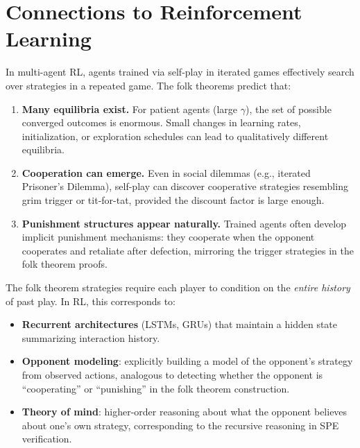 \documentclass[11pt,a4paper]{article}
\begin{document}

\section{Connections to Reinforcement Learning}
\label{sec:rl-connections}

\begin{rlconnection}[title={Self-Play and Emergent Cooperation}]
In multi-agent RL, agents trained via self-play in iterated games
effectively search over strategies in a repeated game. The folk theorems
predict that:
\begin{enumerate}[label=(\roman*)]
    \item \textbf{Many equilibria exist.} For patient agents (large
    $\gamma$), the set of possible converged outcomes is enormous. Small
    changes in learning rates, initialization, or exploration schedules can
    lead to qualitatively different equilibria.
    \item \textbf{Cooperation can emerge.} Even in social dilemmas (e.g.,
    iterated Prisoner's Dilemma), self-play can discover cooperative
    strategies resembling grim trigger or tit-for-tat, provided the
    discount factor is large enough.
    \item \textbf{Punishment structures appear naturally.} Trained agents
    often develop implicit punishment mechanisms: they cooperate when the
    opponent cooperates and retaliate after defection, mirroring the
    trigger strategies in the folk theorem proofs.
\end{enumerate}
\end{rlconnection}

\begin{rlconnection}[title={Opponent Modeling}]
The folk theorem strategies require each player to condition on the
\emph{entire history} of past play. In RL, this corresponds to:
\begin{itemize}
    \item \textbf{Recurrent architectures} (LSTMs, GRUs) that maintain a
    hidden state summarizing interaction history.
    \item \textbf{Opponent modeling}: explicitly building a model of the
    opponent's strategy from observed actions, analogous to detecting
    whether the opponent is ``cooperating'' or ``punishing'' in the folk
    theorem construction.
    \item \textbf{Theory of mind}: higher-order reasoning about what the
    opponent believes about one's own strategy, corresponding to the
    recursive reasoning in SPE verification.
\end{itemize}
\end{rlconnection}
\end{document}
